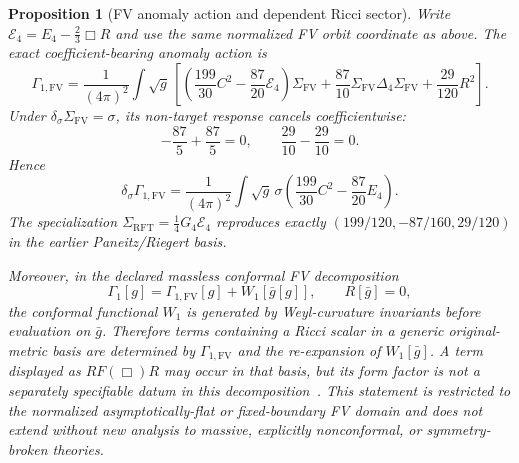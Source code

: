 \documentclass[11pt]{article}
\newtheorem{proposition}[theorem]{Proposition}
\theoremstyle{definition}
\theoremstyle{remark}
\begin{document}
\begin{proposition}[FV anomaly action and dependent Ricci sector]
Write \(\mathcal E_4=E_4-\frac23\Box R\) and use the same normalized FV
orbit coordinate as above.  The exact coefficient-bearing anomaly action is
\[
 \Gamma_{1,\mathrm{FV}}=\frac1{(4\pi)^2}\int\!\sqrt g\,
 \left[\left(\frac{199}{30}C^2-\frac{87}{20}\mathcal E_4\right)
 \Sigma_{\mathrm{FV}}
 +\frac{87}{10}\Sigma_{\mathrm{FV}}\Delta_4\Sigma_{\mathrm{FV}}
 +\frac{29}{120}R^2\right].
\]
Under \(\delta_\sigma\Sigma_{\mathrm{FV}}=\sigma\), its non-target response
cancels coefficientwise:
\[
 -\frac{87}{5}+\frac{87}{5}=0,
 \qquad
 \frac{29}{10}-\frac{29}{10}=0.
\]
Hence
\[
 \delta_\sigma\Gamma_{1,\mathrm{FV}}
 =\frac1{(4\pi)^2}\int\!\sqrt g\,\sigma
 \left(\frac{199}{30}C^2-\frac{87}{20}E_4\right).
\]
The specialization
\(\Sigma_{\mathrm{RFT}}=\frac14G_4\mathcal E_4\) reproduces exactly
\((199/120,-87/160,29/120)\) in the earlier Paneitz/Riegert basis.

Moreover, in the declared massless conformal FV decomposition
\[
 \Gamma_1[g]=\Gamma_{1,\mathrm{FV}}[g]+W_1[\bar g[g]],
 \qquad R[\bar g]=0,
\]
the conformal functional \(W_1\) is generated by Weyl-curvature invariants
before evaluation on \(\bar g\).  Therefore terms containing a Ricci scalar
in a generic original-metric basis are determined by
\(\Gamma_{1,\mathrm{FV}}\) and the re-expansion of \(W_1[\bar g]\).  A term
displayed as \(R F(\Box)R\) may occur in that basis, but its form factor is not
a separately specifiable datum in this decomposition~\cite{BarvinskyWachowski}.
This statement is restricted to the normalized asymptotically-flat or
fixed-boundary FV domain and does not extend without new analysis to massive,
explicitly nonconformal, or symmetry-broken theories.
\end{proposition}
\end{document}
